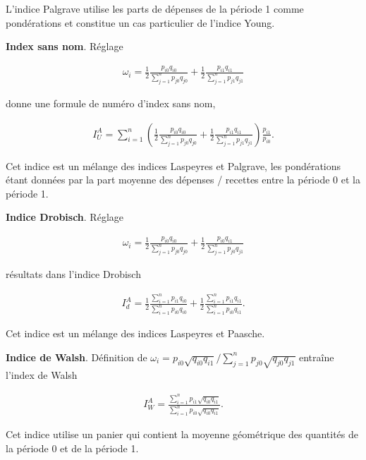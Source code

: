 \documentclass[
]{article}
\begin{document}
L'indice Palgrave utilise les parts de dépenses de la période 1 comme pondérations et constitue un cas particulier de l'indice Young.

\textbf{Index sans nom}. Réglage

\begin{align*}
\omega_{i} = \frac{1}{2} \frac{p_{i0} q_{i0}}{\sum_{j = 1}^{n} p_{j0} q_{j0}} + \frac{1}{2} \frac{p_{i1} q_{i1}}{\sum_{j = 1}^{n} p_{j1} q_{j1}}
\end{align*}

donne une formule de numéro d'index sans nom,

\begin{align*}
I^{A}_{U} = \sum_{i = 1}^{n} \left(\frac{1}{2} \frac{p_{i0} q_{i0}}{\sum_{j = 1}^{n} p_{j0} q_{j0}} + \frac{1}{2} \frac{p_{i1} q_{i1}}{\sum_{j = 1}^{n} p_{j1} q_{j1}} \right) \frac{p_{i1}}{p_{i0}}.
\end{align*}

Cet indice est un mélange des indices Laspeyres et Palgrave, les pondérations étant données par la part moyenne des dépenses / recettes entre la période 0 et la période 1.

\textbf{Indice Drobisch}. Réglage

\begin{align*}
\omega_{i} = \frac{1}{2} \frac{p_{i0} q_{i0}}{\sum_{j = 1}^{n} p_{j0} q_{j0}} + \frac{1}{2} \frac{p_{i0} q_{i1}}{\sum_{j = 1}^{n} p_{j0} q_{j1}}
\end{align*}

résultats dans l'indice Drobisch

\begin{align*}
I^{A}_{d} = \frac{1}{2} \frac{\sum_{i = 1}^{n} p_{i1} q_{i0}}{\sum_{i = 1}^{n} p_{i0} q_{i0}} + \frac{1}{2} \frac{\sum_{i = 1}^{n} p_{i1} q_{i1}}{\sum_{i = 1}^{n} p_{i0} q_{i1}}.
\end{align*}

Cet indice est un mélange des indices Laspeyres et Paasche.

\textbf{Indice de Walsh}. Définition de \(\omega_{i} = p_{i0} \sqrt{q_{i0} q_{i1}} / \sum_{j = 1}^{n} p_{j0} \sqrt{q_{j0} q_{j1}}\) entraîne l'index de Walsh

\begin{align*}
I^{A}_{W} = \frac{\sum_{i = 1}^{n} p_{i1} \sqrt{q_{i0} q_{i1}}}{\sum_{i = 1}^{n} p_{i0} \sqrt{q_{i0} q_{i1}}}.
\end{align*}

Cet indice utilise un panier qui contient la moyenne géométrique des quantités de la période 0 et de la période 1.
\end{document}
